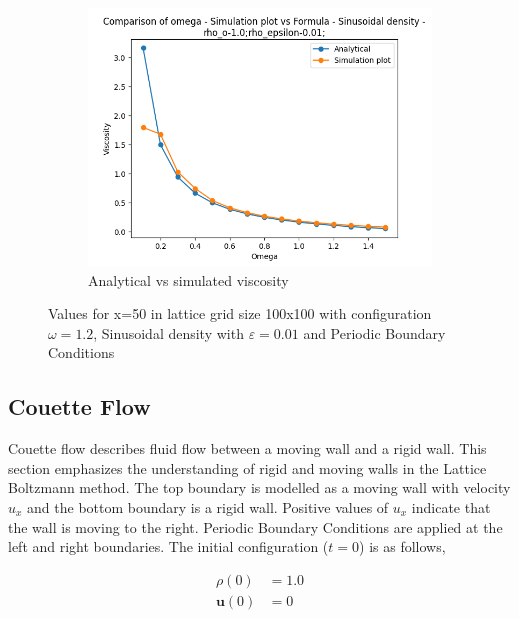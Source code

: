\documentclass[a4paper,11pt]{report}
\begin{document}
\begin{figure}[h!]
\begin{subfigure}{0.3\textwidth}
        \includegraphics[width=\linewidth]{HPC_report/images/shear_wave_decay/Omega_comparison_Sinusoidal density_0.1_1.5_15.png}
        \caption{Analytical vs simulated viscosity}
        \label{fig:d_ac}
    \end{subfigure}
    \caption{Values for x=50 in lattice grid size 100x100 with configuration $\omega = 1.2$, Sinusoidal density with $\varepsilon = 0.01$ and Periodic Boundary Conditions}
\end{figure} 

\subsection{Couette Flow}
Couette flow describes fluid flow between a moving wall and a rigid wall. This section emphasizes the understanding of rigid and moving walls in the Lattice Boltzmann method. The top boundary is modelled as a moving wall with velocity $u_x$ and the bottom boundary is a rigid wall. Positive values of $u_x$ indicate that the wall is moving to the right. Periodic Boundary Conditions are applied at the left and right boundaries. The initial configuration ($t=0$) is as follows,

\begin{equation}
    \begin{aligned}
        \rho \left(0\right) &= 1.0 \\
        \mathbf{u} \left(0\right) &= 0
    \end{aligned}
    \label{eq:inital_config_default}
\end{equation}
\end{document}
